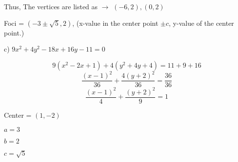 \documentclass{report}
\begin{document}
Thus, The vertices are listed as $\rightarrow$ $ (-6,2), (0,2)$
\vspace{2mm}

Foci = $(-3\pm{\sqrt{5}}, 2)$, (x-value in the center point $\pm{c}$, y-value of the center point.)
\bigbreak \noindent \bigbreak \noindent
\noindent
\begin{large}
 c) $9 x^2+4 y^2-18 x+16 y-11=0$
\end{large}
\vspace{5mm}

\vspace{3mm}
\vspace{3mm}

$$
9\left(x^2-2 x+1\right)+4\left(y^2+4 y+4\right)=11+9+16
$$
$$
\frac{(x-1)^2}{36}+\frac{4(y+2)^2}{36}=\frac{36}{36}
$$
$$
\frac{(x-1)^2}{4}+\frac{(y+2)^2}{9}=1
$$
\vspace{4mm}

Center = $(1,-2)$

$a = 3$

$b = 2$

$c = \sqrt{5}$
\end{document}
